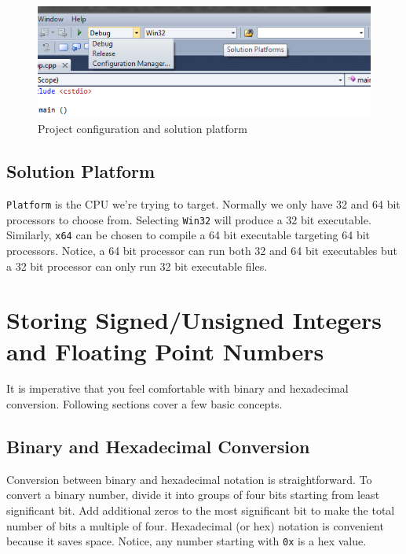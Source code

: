\documentclass{article}
\begin{document}
\begin{figure}[H]
\centering
\label{Configuration-Platform}
\includegraphics[scale=0.6]{ConfigurationPlatform.png}
\caption{Project configuration and solution platform}
\end{figure}

\subsection{Solution Platform}
\verb|Platform| is the CPU we're trying to target. Normally we only have 32 and 64 bit processors to choose from. Selecting \verb|Win32| will produce a 32 bit executable. Similarly, \verb|x64| can be chosen to compile a 64 bit executable targeting 64 bit processors. Notice, a 64 bit processor can run both 32 and 64 bit executables but a 32 bit processor can only run 32 bit executable files.

\section{Storing Signed/Unsigned Integers and Floating Point Numbers}
It is imperative that you feel comfortable with binary and hexadecimal conversion. Following sections cover a few basic concepts.

\subsection{Binary and Hexadecimal Conversion}
Conversion between binary and hexadecimal notation is straightforward. To convert a binary number, divide it into groups of four bits starting from least significant bit. Add additional zeros to the most significant bit to make the total number of bits a multiple of four. Hexadecimal (or hex) notation is convenient because it saves space. Notice, any number starting with \verb|0x| is a hex value.
\end{document}
